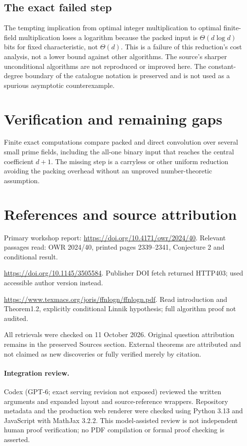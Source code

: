 \documentclass[11pt]{article}
\begin{document}
\subsection{The exact failed step}
The tempting implication from optimal integer multiplication to optimal finite-field multiplication loses a logarithm because the packed input is $\Theta(d\log d)$ bits for fixed characteristic, not $\Theta(d)$. This is a failure of this reduction's cost analysis, not a lower bound against other algorithms. The source's sharper unconditional algorithms are not reproduced or improved here. The constant-degree boundary of the catalogue notation is preserved and is not used as a spurious asymptotic counterexample.
\section{Verification and remaining gaps}
Finite exact computations compare packed and direct convolution over several small prime fields, including the all-one binary input that reaches the central coefficient $d+1$. The missing step is a carryless or other uniform reduction avoiding the packing overhead without an unproved number-theoretic assumption.

\section{References and source attribution}
Primary workshop report: \url{https://doi.org/10.4171/owr/2024/40}. Relevant passages read: OWR 2024/40, printed pages 2339--2341, Conjecture 2 and conditional result.

\url{https://doi.org/10.1145/3505584}. Publisher DOI fetch returned HTTP403; used accessible author version instead.

\url{https://www.texmacs.org/joris/ffnlogn/ffnlogn.pdf}. Read introduction and Theorem1.2, explicitly conditional Linnik hypothesis; full algorithm proof not audited.

All retrievals were checked on 11 October 2026. Original question attribution remains in the preserved Sources section. External theorems are attributed and not claimed as new discoveries or fully verified merely by citation.


\paragraph{Integration review.} Codex (GPT-6; exact serving revision not exposed) reviewed the written arguments and expanded layout and source-reference wrappers. Repository metadata and the production web renderer were checked using Python 3.13 and JavaScript with MathJax 3.2.2. This model-assisted review is not independent human proof verification; no PDF compilation or formal proof checking is asserted.
\end{document}
